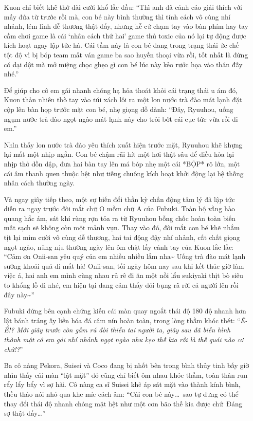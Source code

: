 \documentclass[../main.tex]{subfiles}
\begin{document}
Kuon chỉ biết khẽ thở dài cười khổ lắc đầu: ``Thì anh đã cảnh cáo giải thích với mấy đứa từ trước rồi mà, con bé này bình thường thì tính cách vô cùng nhí nhảnh, lém lỉnh dễ thương thật đấy, nhưng hễ cứ chạm tay vào bàn phím hay tay cầm chơi game là cái `nhân cách thứ hai' game thủ toxic của nó lại tự động được kích hoạt ngay lập tức hà. Cái tầm này là con bé đang trong trạng thái ức chế tột độ vì bị bóp team mất ván game ba sao huyền thoại vừa rồi, tốt nhất là đừng có dại dột mà mở miệng chọc ghẹo gì con bé lúc này kẻo rước họa vào thân đấy nhé.''

Để giúp cho cô em gái nhanh chóng hạ hỏa thoát khỏi cái trạng thái u ám đó, Kuon thản nhiên thò tay vào túi xách lôi ra một lon nước trà đào mát lạnh đặt cộp lên bàn họp trước mặt con bé, nhẹ giọng dỗ dành: ``Đây, Ryuuhou, uống ngụm nước trà đào ngọt ngào mát lạnh này cho trôi bớt cái cục tức vừa rồi đi em.''

Nhìn thấy lon nước trà đào yêu thích xuất hiện trước mặt, Ryuuhou khẽ khựng lại mất một nhịp ngắn. Con bé chậm rãi hít một hơi thật sâu để điều hòa lại nhịp thở dồn dập, đưa hai bàn tay lên má bóp nhẹ một cái *BỘP* rõ lớn, một cái âm thanh quen thuộc hệt như tiếng chuông kích hoạt khởi động lại hệ thống nhân cách thường ngày.

Và ngay giây tiếp theo, một sự biến đổi thần kỳ chấn động tâm lý đã lập tức diễn ra ngay trước đôi mắt chữ O mồm chữ A của Fubuki. Toàn bộ vầng hào quang hắc ám, sát khí rùng rợn tỏa ra từ Ryuuhou bỗng chốc hoàn toàn biến mất sạch sẽ không còn một mảnh vụn. Thay vào đó, đôi mắt con bé khẽ nhắm tịt lại mỉm cười vô cùng dễ thương, hai tai động đậy nhí nhảnh, cất chất giọng ngọt ngào, nũng nịu thường ngày lên ôm chặt lấy cánh tay của Kuon lắc lắc: ``Cảm ơn Onii-san yêu quý của em nhiều nhiều lắm nha\~{} Uống trà đào mát lạnh sướng khoái quá đi mất hà! Onii-san, tối ngày hôm nay sau khi kết thúc giờ làm việc á, hai anh em mình cùng nhau rủ rê đi ăn một nồi lẩu sukiyaki thịt bò siêu to khổng lồ đi nhé, em hiện tại đang cảm thấy đói bụng rã rời cả người lên rồi đây này\~{}''

Fubuki đứng bên cạnh chứng kiến cái màn quay ngoắt thái độ 180 độ nhanh hơn lật bánh tráng ấy liền hóa đá câm nín hoàn toàn, trong lòng thầm khóc thét: ``\textit{Ê-Ể!? Mới giây trước còn gầm rú đòi thiến tai người ta, giây sau đã biến hình thành một cô em gái nhí nhảnh ngọt ngào như kẹo thế kia rồi là thế quái nào cơ chứ!?}''

Ba cô nàng Pekora, Suisei và Coco đang bị nhốt bên trong bình thủy tinh bấy giờ nhìn thấy cái màn ``lật mặt'' đó cũng chỉ biết ôm nhau khóc thầm, toàn thân run rẩy lẩy bẩy vì sợ hãi. Cô nàng ca sĩ Suisei khẽ áp sát mặt vào thành kính bình, thều thào nói nhỏ qua khe míc cách âm: ``Cái con bé này\dots\ sao tự dưng có thể thay đổi thái độ nhanh chóng mặt hệt như một cơn bão thế kia được chứ\ Đáng sợ thật đấy\dots''
\end{document}
